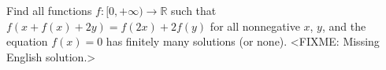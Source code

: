 \problem{}
Find all functions $f \colon [0, +\infty)\to \mathbb{R}$ such that
$f(x + f(x) + 2 y) = f(2 x) + 2 f(y)$ for all nonnegative $x$, $y$, and the
equation $f(x) = 0$ has finitely many solutions (or none).
\solution
<FIXME: Missing English solution.>
\endproblem
